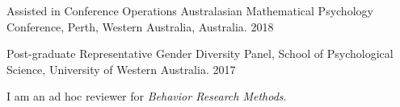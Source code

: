     \begin{cvhonors}
    
    
    \cvhonor
    {Assisted in Conference Operations} %
    {Australasian Mathematical Psychology Conference, Perth, Western Australia, Australia.} %
    {} %
    {2018} %
      
    \cvhonor
    {Post-graduate Representative} %
    {Gender Diversity Panel, School of Psychological Science, University of Western Australia.} %
    {} %
    {2017} %


    
\end{cvhonors}
\begin{minipage}{\textwidth}

\begin{small} \color{black}
I am an ad hoc reviewer for \textit{Behavior Research Methods}.
\end{small}
\end{minipage}


